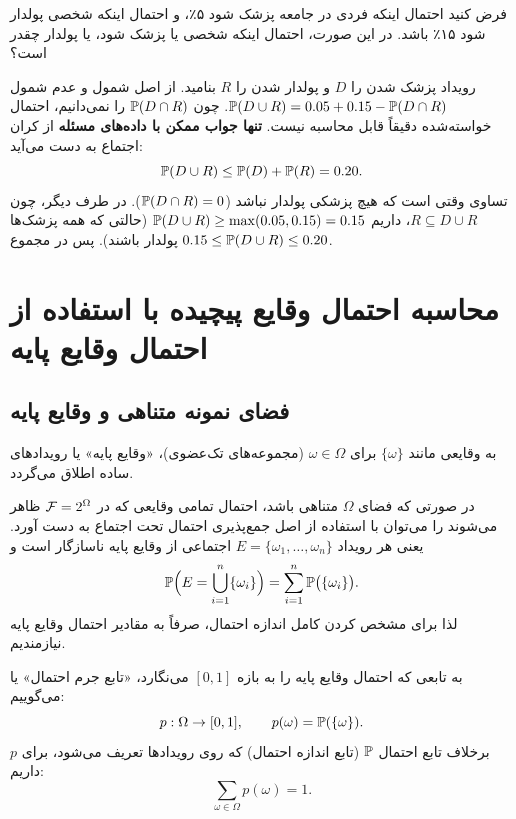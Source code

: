 \begin{example}
فرض کنید احتمال اینکه فردی در جامعه پزشک شود ۵٪، و احتمال اینکه شخصی پولدار شود ۱۵٪ باشد. در این صورت، احتمال اینکه شخصی یا پزشک شود، یا پولدار چقدر است؟
\begin{solution}
رویداد پزشک شدن را $D$ و پولدار شدن را $R$ بنامید. از اصل شمول و عدم شمول
$\mathbb{P}(D\cup R)=0.05+0.15-\mathbb{P}(D\cap R)$.
چون $\mathbb{P}(D\cap R)$ را نمی‌دانیم، احتمال خواسته‌شده دقیقاً قابل محاسبه نیست. \textbf{تنها جواب ممکن با داده‌های مسئله} از کران اجتماع به دست می‌آید:
\[\mathbb{P}(D\cup R)\le \mathbb{P}(D)+\mathbb{P}(R)=0.20 .\]
تساوی وقتی است که هیچ پزشکی پولدار نباشد ($\mathbb{P}(D\cap R)=0$). در طرف دیگر، چون $R\subseteq D\cup R$، داریم $\mathbb{P}(D\cup R)\ge\max(0.05,0.15)=0.15$ (حالتی که همه پزشک‌ها پولدار باشند). پس در مجموع
$0.15\le \mathbb{P}(D\cup R)\le 0.20$.
\end{solution}
\end{example}

\section{محاسبه احتمال وقایع پیچیده با استفاده از احتمال وقایع پایه}

\subsection{فضای نمونه متناهی و وقایع پایه}

\begin{definition}
به وقایعی مانند $\{\omega\}$ برای $\omega\in\Omega$ (مجموعه‌های تک‌عضوی)، «وقایع پایه» یا رویدادهای ساده اطلاق می‌گردد.
\end{definition}

در صورتی که فضای $\Omega$ متناهی باشد، احتمال تمامی وقایعی که در $\mathcal{F}=2^\Omega$ ظاهر می‌شوند را می‌توان با استفاده از اصل جمع‌پذیری احتمال تحت اجتماع به دست آورد. یعنی هر رویداد $E=\{\omega_1,\ldots,\omega_n\}$ اجتماعی از وقایع پایه ناسازگار است و
\[
\mathbb{P}\Big(E=\bigcup_{i=1}^{n}\{\omega_i\}\Big)=\sum_{i=1}^{n}\mathbb{P}\big(\{\omega_i\}\big).
\]
لذا برای مشخص کردن کامل اندازه احتمال، صرفاً به مقادیر احتمال وقایع پایه نیازمندیم.

\begin{definition}
به تابعی که احتمال وقایع پایه را به بازه $[0,1]$ می‌نگارد، «تابع جرم احتمال» یا  می‌گوییم:
\[p:\Omega\to[0,1],\qquad p(\omega)=\mathbb{P}(\{\omega\}).\]
برخلاف تابع احتمال $\mathbb{P}$ (تابع اندازه احتمال) که روی رویدادها تعریف می‌شود، برای $p$ داریم:
\[\sum_{\omega\in\Omega}p(\omega)=1 .\]
\end{definition}

